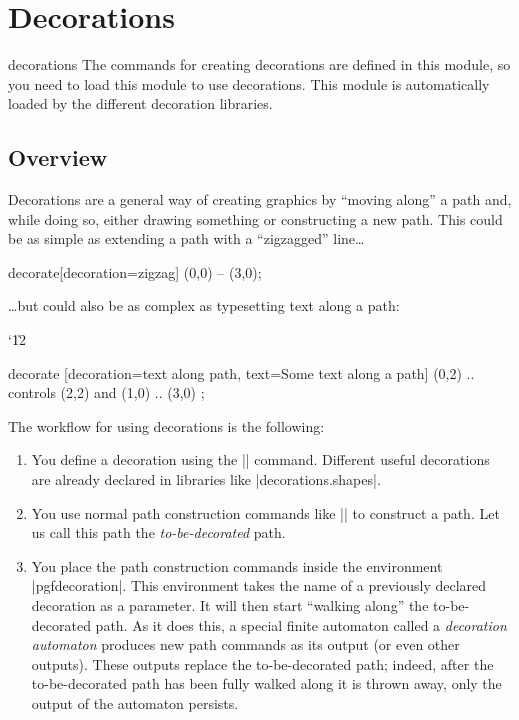 %
%
%


\section{Decorations}
\label{section-base-decorations}

\begin{pgfmodule}{decorations}
    The commands for creating decorations are defined in this module, so you
    need to load this module to use decorations. This module is automatically
    loaded by the different decoration libraries.
\end{pgfmodule}


\subsection{Overview}

Decorations are a general way of creating graphics by ``moving along'' a path
and, while doing so, either drawing something or constructing a new path. This
could be as simple as extending a path with a ``zigzagged'' line\ldots
%
\begin{codeexample}[preamble={\usetikzlibrary{decorations,decorations.pathmorphing}}]
\tikz \draw decorate[decoration=zigzag] {(0,0) -- (3,0)};
\end{codeexample}
%
\ldots but could also be as complex as typesetting text along a path:
%
{\catcode`\|12
\begin{codeexample}[preamble={\usetikzlibrary{decorations,decorations.text}}]
\tikz \path decorate [decoration={text along path,
     text={Some text along a path}}]
   { (0,2) .. controls (2,2) and (1,0) .. (3,0) };
\end{codeexample}
}

The workflow for using decorations is the following:
%
\begin{enumerate}
    \item You define a decoration using the |\pgfdeclaredecoration| command.
        Different useful decorations are already declared in libraries like
        |decorations.shapes|.
    \item You use normal path construction commands like |\pgfpathlineto| to
        construct a path. Let us call this path the \emph{to-be-decorated}
        path.
    \item You place the path construction commands inside the environment
        |{pgfdecoration}|. This environment takes the name of a previously
        declared decoration as a parameter. It will then start ``walking
        along'' the to-be-decorated path. As it does this, a special finite
        automaton called a \emph{decoration automaton} produces new path
        commands as its output (or even other outputs). These outputs replace
        the to-be-decorated path; indeed, after the to-be-decorated path has
        been fully walked along it is thrown away, only the output of the
        automaton persists.
\end{enumerate}

